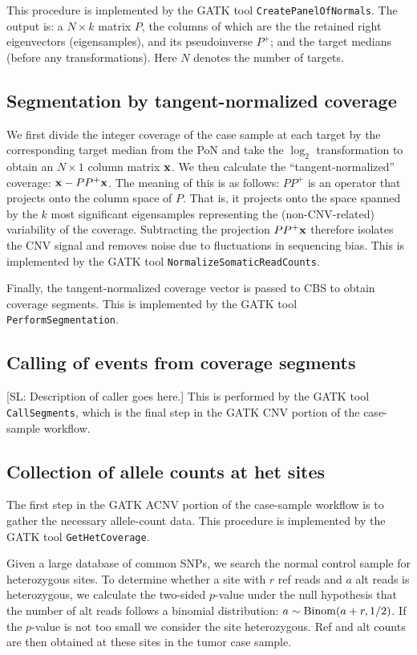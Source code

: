 \documentclass[nofootinbib,amssymb,amsmath]{revtex4}
\def\SL#1{{\color [rgb]{0,0,0.8} [SL: #1]}}
\begin{document}
This procedure is implemented by the GATK tool \texttt{CreatePanelOfNormals}.  The output is: a $N \times k$ matrix $P$, the columns of which are the the retained right eigenvectors (eigensamples), and its pseudoinverse $P^+$; and the target medians (before any transformations).  Here $N$ denotes the number of targets.

\subsection{Segmentation by tangent-normalized coverage}
We first divide the integer coverage of the case sample at each target by the corresponding target median from the PoN and take the $\log_2$ transformation to obtain an $N \times 1$ column matrix ${\bf x}$.  We then calculate the ``tangent-normalized'' coverage: ${\bf x} - PP^+ {\bf x}$.  The meaning of this is as follows: $PP^+$ is an operator that projects onto the column space of $P$.  That is, it projects onto the space spanned by the $k$ most significant eigensamples representing the (non-CNV-related) variability of the coverage.  Subtracting the projection $PP^+ {\bf x}$ therefore isolates the CNV signal and removes noise due to fluctuations in sequencing bias.  This is implemented by the GATK tool \texttt{NormalizeSomaticReadCounts}.

Finally, the tangent-normalized coverage vector is passed to CBS to obtain coverage segments.  This is implemented by the GATK tool \texttt{PerformSegmentation}.

\subsection{Calling of events from coverage segments} \label{gatk-cnv-caller}
\SL{Description of caller goes here.}  This is performed by the GATK tool \texttt{CallSegments}, which is the final step in the GATK CNV portion of the case-sample workflow.

\subsection{Collection of allele counts at het sites}
The first step in the GATK ACNV portion of the case-sample workflow is to gather the necessary allele-count data.  This procedure is implemented by the GATK tool \texttt{GetHetCoverage}. 

Given a large database of common SNPs, we search the normal control sample for heterozygous sites.  To determine whether a site with $r$ ref reads and $a$ alt reads is heterozygous, we calculate the two-sided $p$-value under the null hypothesis that the number of alt reads follows a binomial distribution: $a \sim {\rm Binom}(a + r, 1/2)$.  If the $p$-value is not too small we consider the site heterozygous.  Ref and alt counts are then obtained at these sites in the tumor case sample. 
\end{document}
